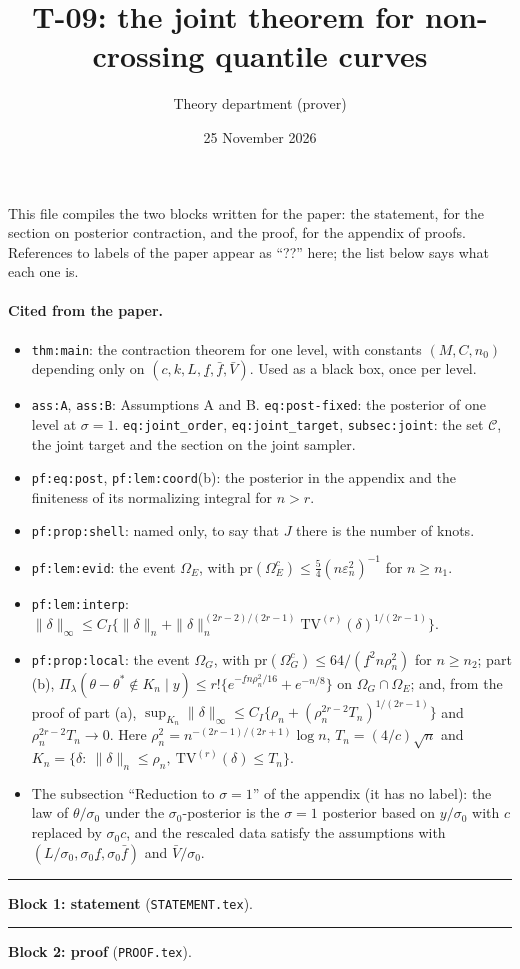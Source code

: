 \documentclass[12pt]{article}
\title{T-09: the joint theorem for non-crossing quantile curves}
\author{Theory department (prover)}
\date{25 November 2026}
\theoremstyle{definition}
\theoremstyle{remark}
\providecommand{\pr}{\mathrm{pr}}
\providecommand{\TV}{\mathrm{TV}}
\providecommand{\thetas}{\theta^{*}}
\providecommand{\en}{\varepsilon_n}
\providecommand{\fl}{\underline f}
\providecommand{\fu}{\bar f}
\providecommand{\Vb}{\bar V}
\providecommand{\nn}[1]{\|#1\|_n}
\begin{document}
\maketitle

\noindent This file compiles the two blocks written for the paper: the statement, for the section on posterior contraction, and the proof, for the appendix of proofs. References to labels of the paper appear as ``??'' here; the list below says what each one is.

\paragraph{Cited from the paper.}
\begin{itemize}\itemsep1pt
\item \texttt{thm:main}: the contraction theorem for one level, with constants $(M,C,n_0)$ depending only on $(c,k,L,\fl,\fu,\Vb)$. Used as a black box, once per level.
\item \texttt{ass:A}, \texttt{ass:B}: Assumptions A and B. \texttt{eq:post-fixed}: the posterior of one level at $\sigma=1$. \texttt{eq:joint\_order}, \texttt{eq:joint\_target}, \texttt{subsec:joint}: the set $\mathcal C$, the joint target and the section on the joint sampler.
\item \texttt{pf:eq:post}, \texttt{pf:lem:coord}(b): the posterior in the appendix and the finiteness of its normalizing integral for $n>r$.
\item \texttt{pf:prop:shell}: named only, to say that $J$ there is the number of knots.
\item \texttt{pf:lem:evid}: the event $\Omega_E$, with $\pr(\Omega_E^c)\le\frac54(n\en^2)^{-1}$ for $n\ge n_1$.
\item \texttt{pf:lem:interp}: $\|\delta\|_\infty\le C_I\{\nn{\delta}+\nn{\delta}^{(2r-2)/(2r-1)}\TV^{(r)}(\delta)^{1/(2r-1)}\}$.
\item \texttt{pf:prop:local}: the event $\Omega_G$, with $\pr(\Omega_G^c)\le64/(\fl^2n\rho_n^2)$ for $n\ge n_2$; part (b), $\Pi_\lambda(\theta-\thetas\notin K_n\mid y)\le r!\{e^{-\fl n\rho_n^2/16}+e^{-n/8}\}$ on $\Omega_G\cap\Omega_E$; and, from the proof of part (a), $\sup_{K_n}\|\delta\|_\infty\le C_I\{\rho_n+(\rho_n^{2r-2}T_n)^{1/(2r-1)}\}$ and $\rho_n^{2r-2}T_n\to0$. Here $\rho_n^2=n^{-(2r-1)/(2r+1)}\log n$, $T_n=(4/c)\sqrt n$ and $K_n=\{\delta:\ \nn{\delta}\le\rho_n,\ \TV^{(r)}(\delta)\le T_n\}$.
\item The subsection ``Reduction to $\sigma=1$'' of the appendix (it has no label): the law of $\theta/\sigma_0$ under the $\sigma_0$-posterior is the $\sigma=1$ posterior based on $y/\sigma_0$ with $c$ replaced by $\sigma_0c$, and the rescaled data satisfy the assumptions with $(L/\sigma_0,\sigma_0\fl,\sigma_0\fu)$ and $\Vb/\sigma_0$.
\end{itemize}

\bigskip\hrule\bigskip
\noindent\textbf{Block 1: statement} (\texttt{STATEMENT.tex}).



\bigskip\hrule\bigskip
\noindent\textbf{Block 2: proof} (\texttt{PROOF.tex}).


\end{document}

